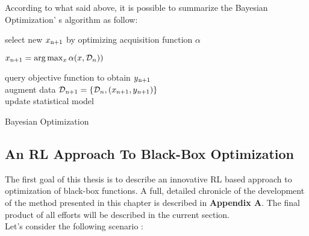According to what said above, it is possible to summarize the Bayesian Optimization' s algorithm as follow:

\begin{algorithm} [h!]
	
	{select new $x\textsubscript{n+1}$ by optimizing acquisition function $\alpha$ \\
		
		\begin{center}
			$x\textsubscript{n+1} = \arg \max_{x} \alpha(x, \mathcal{D}_n))$
		\end{center} 
	
	query objective function to obtain $y\textsubscript{n+1}$ \\
	augment data $\mathcal{D}\textsubscript{n+1} = \{\mathcal{D}_n, (x\textsubscript{n+1}, y\textsubscript{n+1})\}$ \\
	update statistical model 
	} 
	\caption{Bayesian Optimization\cite{DBLP:journals/pieee/ShahriariSWAF16}} 
	\label{BayAlgo}
\end{algorithm}

\subsection{An RL Approach To Black-Box Optimization} The first goal of this thesis is to describe an innovative RL based approach to optimization of black-box functions. A full, detailed chronicle of the development of the method presented in this chapter is described in \textbf{Appendix A}. The final product of all efforts will be described in the current section. \\

Let's consider the following scenario :

